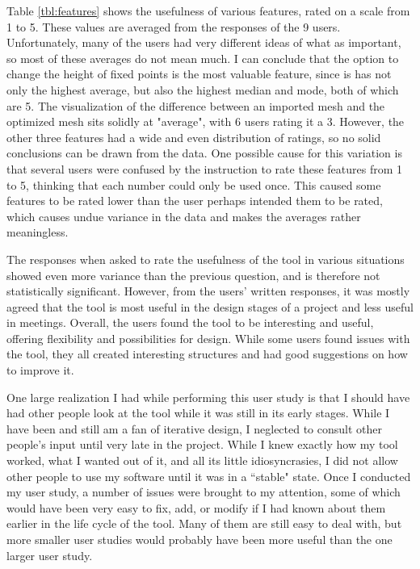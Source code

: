 \documentclass{thesis}
\begin{document}
Table \ref{tbl:features} shows the usefulness of various features, rated on a scale from 1 to 5.  These values are averaged from
the responses of the 9 users.  Unfortunately, many of the users had very different ideas of what as important, so most of these
averages do not mean much.  I can conclude that the option to change the height of fixed points is the most valuable feature,
since is has not only the highest average, but also the highest median and mode, both of which are 5.  The visualization of the
difference between an imported mesh and the optimized mesh sits solidly at "average", with 6 users rating it a 3.  However, the
other three features had a wide and even distribution of ratings, so no solid conclusions can be drawn from the data.  One
possible cause for this variation is that several users were confused by the instruction to rate these features from 1 to 5,
thinking that each number could only be used once.  This caused some features to be rated lower than the user perhaps intended
them to be rated, which causes undue variance in the data and makes the averages rather meaningless.

The responses when asked to rate the usefulness of the tool in various situations showed even more variance than the previous
question, and is therefore not statistically significant.  However, from the users' written responses, it was mostly agreed
that the tool is most useful in the design stages of a project and less useful in meetings.  Overall, the users found the tool
to be interesting and useful, offering flexibility and possibilities for design.  While some users found issues with the tool,
they all created interesting structures and had good suggestions on how to improve it.

One large realization I had while performing this user study is that I should have had other people look at the tool while it
was still in its early stages.  While I have been and still am a fan of iterative design, I neglected to consult other people's
input until very late in the project.  While I knew exactly how my tool worked, what I wanted out of it, and all its little
idiosyncrasies, I did not allow other people to use my software until it was in a ``stable" state.  Once I conducted my user study,
a number of issues were brought to my attention, some of which would have been very easy to fix, add, or modify if I had known
about them earlier in the life cycle of the tool.  Many of them are still easy to deal with, but more smaller user studies
would probably have been more useful than the one larger user study.
\end{document}
